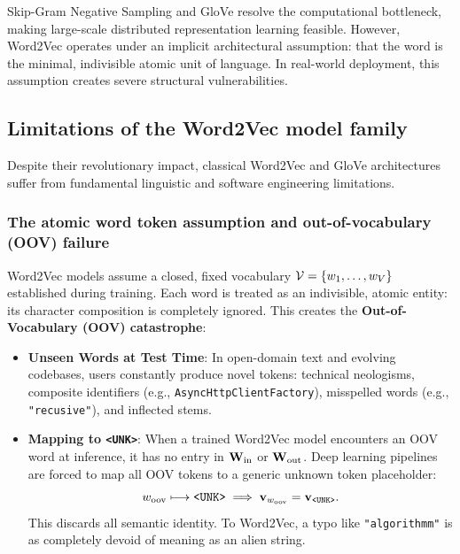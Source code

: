 \documentclass[../../main.tex]{subfiles}
\begin{document}
Skip-Gram Negative Sampling and GloVe resolve the computational bottleneck, making large-scale distributed representation learning feasible. However, Word2Vec operates under an implicit architectural assumption: that the word is the minimal, indivisible atomic unit of language. In real-world deployment, this assumption creates severe structural vulnerabilities.

\clearpage


\subsection{Limitations of the Word2Vec model family}
\label{sec:word2vec_limitations}

Despite their revolutionary impact, classical Word2Vec and GloVe architectures suffer from fundamental linguistic and software engineering limitations.

\subsubsection{The atomic word token assumption and out-of-vocabulary (OOV) failure}
\label{subsec:oov_barrier}

Word2Vec models assume a closed, fixed vocabulary $\mathcal{V} = \{w_1, \dots, w_V\}$ established during training. Each word is treated as an indivisible, atomic entity: its character composition is completely ignored. This creates the \textbf{Out-of-Vocabulary (OOV) catastrophe}:
\begin{itemize}
    \item \textbf{Unseen Words at Test Time}: In open-domain text and evolving codebases, users constantly produce novel tokens: technical neologisms, composite identifiers (e.g., \texttt{AsyncHttpClientFactory}), misspelled words (e.g., \texttt{"recusive"}), and inflected stems.
    \item \textbf{Mapping to \texttt{<UNK>}}: When a trained Word2Vec model encounters an OOV word at inference, it has no entry in $\mathbf{W}_{\text{in}}$ or $\mathbf{W}_{\text{out}}$. Deep learning pipelines are forced to map all OOV tokens to a generic unknown token placeholder:
    \begin{equation}
    \label{eq:unk_collapse}
    w_{\text{oov}} \longmapsto \text{\texttt{<UNK>}} \implies \mathbf{v}_{w_{\text{oov}}} = \mathbf{v}_{\text{\texttt{<UNK>}}}.
    \end{equation}
    This discards all semantic identity. To Word2Vec, a typo like \texttt{"algorithmm"} is as completely devoid of meaning as an alien string.
\end{itemize}
\end{document}
